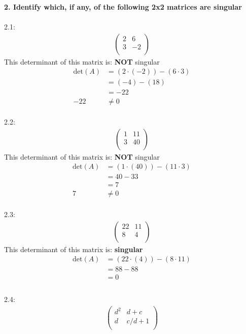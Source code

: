 \documentclass[a4paper,12pt]{article} %
\begin{document}
\noindent
\textbf{2. Identify which, if any, of the following 2x2 matrices are singular} \\
\\2.1: \\
\begin{align*}
\begin{pmatrix}
    2 & 6 \\
    3 & -2 \\
\end{pmatrix}
\end{align*}
This determinant of this matrix is: \textbf{NOT} singular
\begin{align*}
\text{det}(A) &= (2 \cdot (-2)) - (6 \cdot 3) \\
&= (-4) - (18) \\
&= -22 \\
-22 &\neq 0
\end{align*}
\\
2.2: \\
\begin{align*}
\begin{pmatrix}
    1 & 11 \\
    3 & 40 \\
\end{pmatrix}
\end{align*}
This determinant of this matrix is: \textbf{NOT} singular
\begin{align*}
\text{det}(A) &= (1 \cdot (40)) - (11 \cdot 3) \\
&= 40 - 33 \\
&= 7 \\
7 &\neq 0
\end{align*}
\\
2.3: \\
\begin{align*}
\begin{pmatrix}
    22 & 11 \\
    8 & 4 \\
\end{pmatrix}
\end{align*}
This determinant of this matrix is: \textbf{singular}
\begin{align*}
\text{det}(A) &= (22 \cdot (4)) - (8 \cdot 11) \\
&= 88 - 88 \\
&= 0 \\
\end{align*}
\\
2.4: \\
\begin{align*}
\begin{pmatrix}
    d^2 & d+c \\
    d & c/d+1 \\
\end{pmatrix}
\end{align*}
\end{document}
